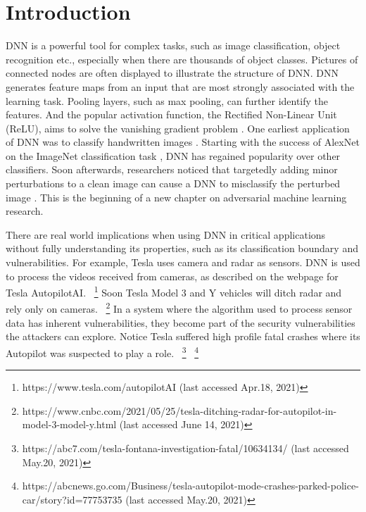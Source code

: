 \documentclass[12pt]{article}
\begin{document}
%
\section{Introduction}
\label{sec:intro}

DNN is a powerful tool for  
complex tasks, such as image classification, object
recognition etc., especially when there are thousands of object
classes. Pictures of 
connected nodes are often displayed to illustrate 
the structure of DNN. DNN generates feature maps from an input that
are most strongly associated 
with the learning task. Pooling layers, such as max pooling, can
further identify the features. And the popular activation function, the
Rectified Non-Linear Unit (ReLU), aims to solve the vanishing gradient
problem \cite{book-deep-learning-2016}. One earliest application of DNN
was to classify handwritten images \cite{lenet1998}. 
Starting with the success of
AlexNet on the ImageNet classification task \cite{alexnet-2012}, DNN has
regained popularity over other classifiers. Soon afterwards,
researchers noticed that 
targetedly adding minor perturbations to a clean image can cause a DNN
to misclassify the perturbed image \cite{attack-LBFGS}. This is the
beginning of a new chapter on 
adversarial machine learning research. 


There are real world implications when using DNN in critical
applications without fully understanding its properties, such as its
classification boundary and vulnerabilities.  For example, 
Tesla uses camera and radar as sensors. DNN is used
to process the videos received from cameras, as described on the
webpage for Tesla AutopilotAI.
~\footnote{https://www.tesla.com/autopilotAI (last accessed Apr.18,
  2021)}
Soon Tesla Model 3 and Y vehicles will ditch radar and rely only on
cameras. 
~\footnote{https://www.cnbc.com/2021/05/25/tesla-ditching-radar-for-autopilot-in-model-3-model-y.html
  (last accessed June 14, 2021)}
In a system where the algorithm used to process sensor data has inherent
vulnerabilities, they become part of the security vulnerabilities the
attackers can explore.  
Notice Tesla suffered high profile
fatal crashes where its Autopilot was suspected to play a role.
~\footnote{https://abc7.com/tesla-fontana-investigation-fatal/10634134/
  (last accessed May.20, 2021)}
~\footnote{https://abcnews.go.com/Business/tesla-autopilot-mode-crashes-parked-police-car/story?id=77753735
  (last accessed May.20, 2021)}
\end{document}
